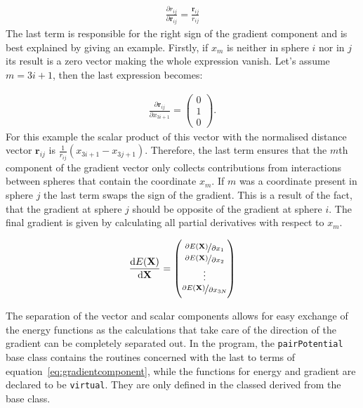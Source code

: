 \begin{align}
    \frac{\partial r_{ij}}{\partial\mathbf{r}_{ij}}=\frac{\mathbf{r}_{ij}}{r_{ij}}
\end{align}%
%
The last term is responsible for the right sign of the gradient component and
is best explained by giving an example. Firstly, if $x_m$ is neither in sphere
$i$ nor in $j$ its result is a zero vector making the whole expression vanish.
Let's assume $m=3i+1$, then the last expression becomes:

\begin{align}
    \frac{\partial\mathbf{r}_{ij}}{\partial x_{3i+1}}=
    \begin{pmatrix}
        0\\1\\0
    \end{pmatrix}.
\end{align}%
%
For this example the scalar product of this vector with the normalised distance
vector $\mathbf{r}_{ij}$ is $\frac{1}{r_{ij}}(x_{3i+1} - x_{3j+1})$. Therefore,
the last term ensures that the $m$th component of the gradient vector only
collects contributions from interactions between spheres that contain the
coordinate $x_m$. If $m$ was a coordinate present in sphere $j$ the last term
swaps the sign of the gradient. This is a result of the fact, that the gradient
at sphere $j$ should be opposite of the gradient at sphere $i$. The final
gradient is given by calculating all partial derivatives with respect to $x_m$.

\begin{align}
    \frac{\dif E(\mathbf{X})}{\dif \mathbf{X}}=
    \begin{pmatrix}
        \nicefrac{\partial E(\mathbf{X})}{\partial x_1}\\
        \nicefrac{\partial E(\mathbf{X})}{\partial x_2}\\
        \vdots\\
        \nicefrac{\partial E(\mathbf{X})}{\partial x_{3N}}
    \end{pmatrix}
\end{align}

The separation of the vector and scalar components allows for easy exchange of
the energy functions as the calculations that take care of the direction of the
gradient can be completely separated out. In the program, the
\texttt{pairPotential} base class contains the routines concerned with the last
to terms of equation~\eqref{eq:gradientcomponent}, while the functions for
energy and gradient are declared to be \texttt{virtual}. They are only defined
in the classed derived from the base class.

